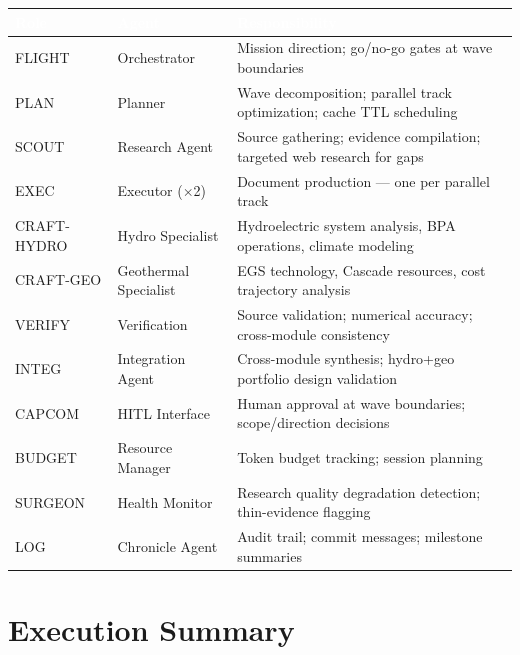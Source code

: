 \documentclass[11pt,letterpaper]{article}
\newcommand{\tableheader}[1]{\textbf{\sffamily\textcolor{white}{#1}}}
\begin{document}
\begin{center}
\begin{tabularx}{\textwidth}{C{1.5cm}L{2.5cm}X}
\toprule
{}
\tableheader{Role} & \tableheader{Agent} & \tableheader{Responsibility} \\
\midrule
FLIGHT & Orchestrator & Mission direction; go/no-go gates at wave boundaries \\
PLAN & Planner & Wave decomposition; parallel track optimization; cache TTL scheduling \\
SCOUT & Research Agent & Source gathering; evidence compilation; targeted web research for gaps \\
EXEC & Executor ($\times$2) & Document production --- one per parallel track \\
CRAFT-HYDRO & Hydro Specialist & Hydroelectric system analysis, BPA operations, climate modeling \\
CRAFT-GEO & Geothermal Specialist & EGS technology, Cascade resources, cost trajectory analysis \\
VERIFY & Verification & Source validation; numerical accuracy; cross-module consistency \\
INTEG & Integration Agent & Cross-module synthesis; hydro+geo portfolio design validation \\
CAPCOM & HITL Interface & Human approval at wave boundaries; scope/direction decisions \\
BUDGET & Resource Manager & Token budget tracking; session planning \\
SURGEON & Health Monitor & Research quality degradation detection; thin-evidence flagging \\
LOG & Chronicle Agent & Audit trail; commit messages; milestone summaries \\
\bottomrule
\end{tabularx}
\end{center}

\section{Execution Summary}
\end{document}

